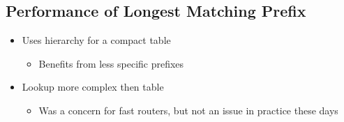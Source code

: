 \documentclass[12pt]{ctexart}   %
\begin{document}
	\subsection{Performance of Longest Matching Prefix}
	\begin{itemize}
		\item Uses hierarchy for a compact table
		\begin{itemize}
			\item Benefits from less specific prefixes
		\end{itemize}
		
		\item Lookup more complex then table
		\begin{itemize}
			\item Was a concern for fast routers, but not an issue in practice these days
		\end{itemize}
	\end{itemize}
	
\end{document}
